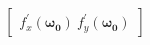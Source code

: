 \documentclass[preview]{standalone}
\begin{document}
\begin{align*}
\begin{bmatrix} f_x^{\prime}(\mathbf{\omega_0})\ f_y^{\prime}(\mathbf{\omega_0}) \end{bmatrix}
\end{align*}
\end{document}
